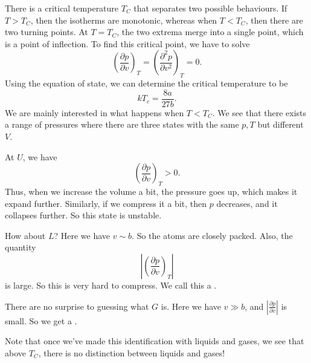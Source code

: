 \documentclass[a4paper]{article}
\begin{document}
There is a critical temperature $T_C$ that separates two possible behaviours. If $T > T_C$, then the isotherms are monotonic, whereas when $T < T_C$, then there are two turning points. At $T = T_C$, the two extrema merge into a single point, which is a point of inflection. To find this critical point, we have to solve
\[
  \left(\frac{\partial p}{\partial v}\right)_T = \left(\frac{\partial^2 p}{\partial v^2}\right)_T = 0.
\]
Using the equation of state, we can determine the critical temperature to be
\[
  kT_c = \frac{8a}{27 b}.
\]
We are mainly interested in what happens when $T < T_C$. We see that there exists a range of pressures where there are three states with the same $p, T$ but different $V$.
\begin{center}
\end{center}
At $U$, we have
\[
  \left(\frac{\partial p}{\partial v}\right)_T > 0.
\]
Thus, when we increase the volume a bit, the pressure goes up, which makes it expand further. Similarly, if we compress it a bit, then $p$ decreases, and it collapses further. So this state is unstable.

How about $L$? Here we have $v \sim b$. So the atoms are closely packed. Also, the quantity
\[
  \left|\left(\frac{\partial p}{\partial v}\right)_T\right|
\]
is large. So this is very hard to compress. We call this a .

There are no surprise to guessing what $G$ is. Here we have $v \gg b$, and $\left|\frac{\partial p}{\partial v}\right|$ is small. So we get a .

Note that once we've made this identification with liquids and gases, we see that above $T_C$, there is no distinction between liquids and gases!
\end{document}
